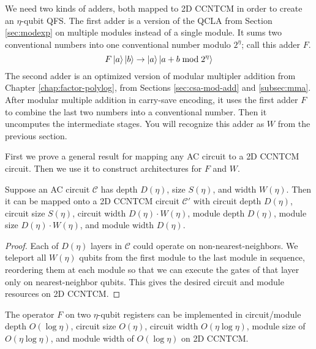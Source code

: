 We need two kinds of adders, both mapped to \textsf{2D CCNTCM} in order to
create an $\eta$-qubit QFS.
The first adder is a version of the QCLA from Section \ref{sec:modexp}
on multiple modules instead of a single module. It sums two
conventional numbers into one conventional number modulo $2^{\eta}$;
call this adder $F$.
%
\begin{equation}
F\left\vert{a}\right\rangle\left\vert{b}\right\rangle \rightarrow \left\vert{a}\right\rangle\left\vert{a+b \bmod 2^{\eta}}\right\rangle
\end{equation}
%
The second adder is an optimized version of modular multipler addition
from
Chapter \ref{chap:factor-polylog},
from Sections \ref{sec:csa-mod-add} and \ref{subsec:mma}.
After modular multiple addition in carry-save encoding,
it uses the first adder $F$ to combine the last two numbers
into a conventional number. Then it uncomputes the intermediate stages.
You will recognize this adder as $W$ from the previous section.

First we prove a general result for mapping any \textsf{AC} circuit
to a \textsf{2D CCNTCM} circuit.
Then we use it to construct architectures for $F$ and $W$.

\begin{lemma}
Suppose an \textsf{AC} circuit $\mathcal{C}$ has
depth $D(\eta)$, size $S(\eta)$, and width $W(\eta)$. Then it can be mapped
onto a \textsf{2D CCNTCM} circuit $\mathcal{C'}$ with circuit depth
$D(\eta)$, circuit size $S(\eta)$, circuit width $D(\eta)\cdot W(\eta)$,
module depth $D(\eta)$, module size $D(\eta)\cdot W(\eta)$, and module width
$D(\eta)$.
\label{lem:ac-ccntcm}
\end{lemma}

\begin{proof}
Each of $D(\eta)$ layers in $\mathcal{C}$ could operate on non-nearest-neighbors.
We teleport all
$W(\eta)$ qubits from the first module to the last module in sequence,
reordering them at each module so that we can execute the gates of that
layer only on nearest-neighbor qubits.
This gives the desired circuit and module resources on
\textsf{2D CCNTCM}.
\end{proof}

\begin{lemma}
The operator $F$ on
two $\eta$-qubit registers can be
implemented in circuit/module depth $O(\log \eta)$, circuit size $O(\eta)$, 
circuit width $O(\eta\log \eta)$, module size of $O(\eta \log \eta)$, and
module width of $O(\log \eta)$ on
\textsf{2D CCNTCM}.
\label{lem:f}
\end{lemma}

